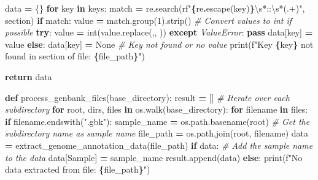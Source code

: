 \documentclass[
]{book}
\newenvironment{Shaded}{\begin{snugshade}}{\end{snugshade}}
\newcommand{\BuiltInTok}[1]{#1}
\newcommand{\CommentTok}[1]{\textcolor[rgb]{0.56,0.35,0.01}{\textit{#1}}}
\newcommand{\ControlFlowTok}[1]{\textcolor[rgb]{0.13,0.29,0.53}{\textbf{#1}}}
\newcommand{\DecValTok}[1]{\textcolor[rgb]{0.00,0.00,0.81}{#1}}
\newcommand{\KeywordTok}[1]{\textcolor[rgb]{0.13,0.29,0.53}{\textbf{#1}}}
\newcommand{\NormalTok}[1]{#1}
\newcommand{\OperatorTok}[1]{\textcolor[rgb]{0.81,0.36,0.00}{\textbf{#1}}}
\newcommand{\PreprocessorTok}[1]{\textcolor[rgb]{0.56,0.35,0.01}{\textit{#1}}}
\newcommand{\SpecialCharTok}[1]{\textcolor[rgb]{0.81,0.36,0.00}{\textbf{#1}}}
\newcommand{\SpecialStringTok}[1]{\textcolor[rgb]{0.31,0.60,0.02}{#1}}
\newcommand{\StringTok}[1]{\textcolor[rgb]{0.31,0.60,0.02}{#1}}
\newcommand{\VariableTok}[1]{\textcolor[rgb]{0.00,0.00,0.00}{#1}}
\newcommand{\VerbatimStringTok}[1]{\textcolor[rgb]{0.31,0.60,0.02}{#1}}
\begin{document}
\begin{Shaded}
\begin{Highlighting}[]
\NormalTok{    data }\OperatorTok{=}\NormalTok{ \{\}}
    \ControlFlowTok{for}\NormalTok{ key }\KeywordTok{in}\NormalTok{ keys:}
\NormalTok{        match }\OperatorTok{=}\NormalTok{ re.search(}\VerbatimStringTok{rf"}\SpecialCharTok{\{}\NormalTok{re}\SpecialCharTok{.}\NormalTok{escape(key)}\SpecialCharTok{\}}\VerbatimStringTok{\textbackslash{}s*::\textbackslash{}s*(.+)"}\NormalTok{, section)}
        \ControlFlowTok{if}\NormalTok{ match:}
\NormalTok{            value }\OperatorTok{=}\NormalTok{ match.group(}\DecValTok{1}\NormalTok{).strip()}
            \CommentTok{\# Convert values to int if possible}
            \ControlFlowTok{try}\NormalTok{:}
\NormalTok{                value }\OperatorTok{=} \BuiltInTok{int}\NormalTok{(value.replace(}\StringTok{\textquotesingle{},\textquotesingle{}}\NormalTok{, }\StringTok{\textquotesingle{}\textquotesingle{}}\NormalTok{))}
            \ControlFlowTok{except} \PreprocessorTok{ValueError}\NormalTok{:}
                \ControlFlowTok{pass}
\NormalTok{            data[key] }\OperatorTok{=}\NormalTok{ value}
        \ControlFlowTok{else}\NormalTok{:}
\NormalTok{            data[key] }\OperatorTok{=} \VariableTok{None}  \CommentTok{\# Key not found or no value}
            \BuiltInTok{print}\NormalTok{(}\SpecialStringTok{f"Key \textquotesingle{}}\SpecialCharTok{\{}\NormalTok{key}\SpecialCharTok{\}}\SpecialStringTok{\textquotesingle{} not found in section of file: }\SpecialCharTok{\{}\NormalTok{file\_path}\SpecialCharTok{\}}\SpecialStringTok{"}\NormalTok{)}
    
    \ControlFlowTok{return}\NormalTok{ data}

\KeywordTok{def}\NormalTok{ process\_genbank\_files(base\_directory):}
\NormalTok{    result }\OperatorTok{=}\NormalTok{ []}
    \CommentTok{\# Iterate over each subdirectory}
    \ControlFlowTok{for}\NormalTok{ root, dirs, files }\KeywordTok{in}\NormalTok{ os.walk(base\_directory):}
        \ControlFlowTok{for}\NormalTok{ filename }\KeywordTok{in}\NormalTok{ files:}
            \ControlFlowTok{if}\NormalTok{ filename.endswith(}\StringTok{".gbk"}\NormalTok{):}
\NormalTok{                sample\_name }\OperatorTok{=}\NormalTok{ os.path.basename(root)  }\CommentTok{\# Get the subdirectory name as sample name}
\NormalTok{                file\_path }\OperatorTok{=}\NormalTok{ os.path.join(root, filename)}
\NormalTok{                data }\OperatorTok{=}\NormalTok{ extract\_genome\_annotation\_data(file\_path)}
                \ControlFlowTok{if}\NormalTok{ data:}
                    \CommentTok{\# Add the sample name to the data}
\NormalTok{                    data[}\StringTok{\textquotesingle{}Sample\textquotesingle{}}\NormalTok{] }\OperatorTok{=}\NormalTok{ sample\_name}
\NormalTok{                    result.append(data)}
                \ControlFlowTok{else}\NormalTok{:}
                    \BuiltInTok{print}\NormalTok{(}\SpecialStringTok{f"No data extracted from file: }\SpecialCharTok{\{}\NormalTok{file\_path}\SpecialCharTok{\}}\SpecialStringTok{"}\NormalTok{)}
    

\end{Highlighting}
\end{Shaded}
\end{document}
